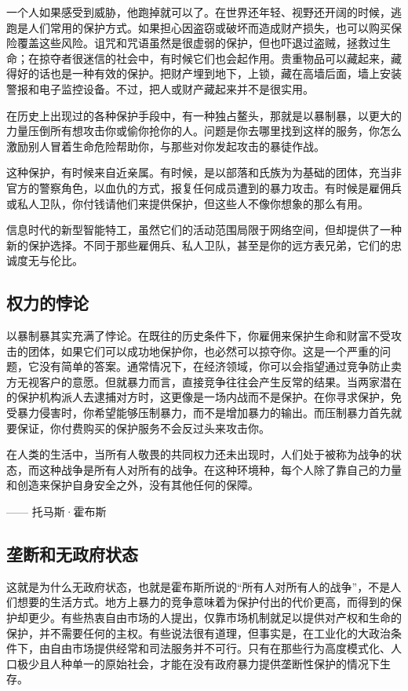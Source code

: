 一个人如果感受到威胁，他跑掉就可以了。在世界还年轻、视野还开阔的时候，逃跑是人们常用的保护方式。如果担心因盗窃或破坏而造成财产损失，也可以购买保险覆盖这些风险。诅咒和咒语虽然是很虚弱的保护，但也吓退过盗贼，拯救过生命；在掠夺者很迷信的社会中，有时候它们也会起作用。贵重物品可以藏起来，藏得好的话也是一种有效的保护。把财产埋到地下，上锁，藏在高墙后面，墙上安装警报和电子监控设备。不过，把人或财产藏起来并不是很实用。

在历史上出现过的各种保护手段中，有一种独占鳌头，那就是以暴制暴，以更大的力量压倒所有想攻击你或偷你抢你的人。问题是你去哪里找到这样的服务，你怎么激励别人冒着生命危险帮助你，与那些对你发起攻击的暴徒作战。

这种保护，有时候来自近亲属。有时候，是以部落和氏族为为基础的团体，充当非官方的警察角色，以血仇的方式，报复任何成员遭到的暴力攻击。有时候是雇佣兵或私人卫队，你付钱请他们来提供保护，但这些人不像你想象的那么有用。

信息时代的新型智能特工，虽然它们的活动范围局限于网络空间，但却提供了一种新的保护选择。不同于那些雇佣兵、私人卫队，甚至是你的远方表兄弟，它们的忠诚度无与伦比。

\subsection{权力的悖论}
以暴制暴其实充满了悖论。在既往的历史条件下，你雇佣来保护生命和财富不受攻击的团体，如果它们可以成功地保护你，也必然可以掠夺你。这是一个严重的问题，它没有简单的答案。通常情况下，在经济领域，你可以会指望通过竞争防止卖方无视客户的意愿。但就暴力而言，直接竞争往往会产生反常的结果。当两家潜在的保护机构派人去逮捕对方时，这更像是一场内战而不是保护。在你寻求保护，免受暴力侵害时，你希望能够压制暴力，而不是增加暴力的输出。而压制暴力首先就要保证，你付费购买的保护服务不会反过头来攻击你。

\begin{tcolorbox}
在人类的生活中，当所有人敬畏的共同权力还未出现时，人们处于被称为战争的状态，而这种战争是所有人对所有的战争。在这种环境种，每个人除了靠自己的力量和创造来保护自身安全之外，没有其他任何的保障。 
\begin{flushright}
—— 托马斯·霍布斯    
\end{flushright}
\end{tcolorbox}

\subsection{垄断和无政府状态}

这就是为什么无政府状态，也就是霍布斯所说的“所有人对所有人的战争”，不是人们想要的生活方式。地方上暴力的竞争意味着为保护付出的代价更高，而得到的保护却更少。有些热衷自由市场的人提出，仅靠市场机制就足以提供对产权和生命的保护，并不需要任何的主权。有些说法很有道理，但事实是，在工业化的大政治条件下，由自由市场提供经常和司法服务并不可行。只有在那些行为高度模式化、人口极少且人种单一的原始社会，才能在没有政府暴力提供垄断性保护的情况下生存。

